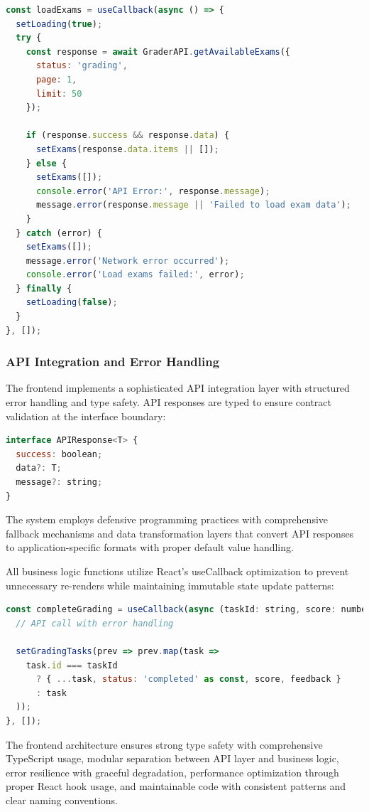 \documentclass[12pt]{article}
\begin{document}
\begin{lstlisting}[language=JavaScript]
const loadExams = useCallback(async () => {
  setLoading(true);
  try {
    const response = await GraderAPI.getAvailableExams({
      status: 'grading',
      page: 1,
      limit: 50
    });
    
    if (response.success && response.data) {
      setExams(response.data.items || []);
    } else {
      setExams([]);
      console.error('API Error:', response.message);
      message.error(response.message || 'Failed to load exam data');
    }
  } catch (error) {
    setExams([]);
    message.error('Network error occurred');
    console.error('Load exams failed:', error);
  } finally {
    setLoading(false);
  }
}, []);
\end{lstlisting}

\subsubsection{API Integration and Error Handling}

The frontend implements a sophisticated API integration layer with structured error handling and type safety. API responses are typed to ensure contract validation at the interface boundary:

\begin{lstlisting}[language=JavaScript]
interface APIResponse<T> {
  success: boolean;
  data?: T;
  message?: string;
}
\end{lstlisting}

The system employs defensive programming practices with comprehensive fallback mechanisms and data transformation layers that convert API responses to application-specific formats with proper default value handling.

All business logic functions utilize React's useCallback optimization to prevent unnecessary re-renders while maintaining immutable state update patterns:

\begin{lstlisting}[language=JavaScript]
const completeGrading = useCallback(async (taskId: string, score: number, feedback?: string) => {
  // API call with error handling
  
  setGradingTasks(prev => prev.map(task => 
    task.id === taskId 
      ? { ...task, status: 'completed' as const, score, feedback }
      : task
  ));
}, []);
\end{lstlisting}

The frontend architecture ensures strong type safety with comprehensive TypeScript usage, modular separation between API layer and business logic, error resilience with graceful degradation, performance optimization through proper React hook usage, and maintainable code with consistent patterns and clear naming conventions.
\end{document}
